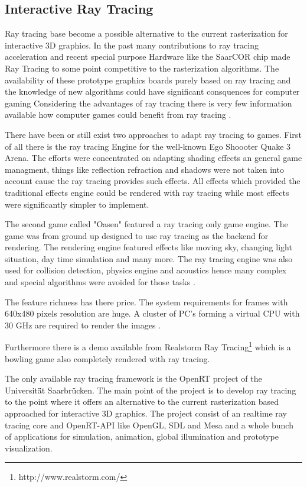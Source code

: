\documentclass[DIV10, abstracton, openright, footsepline, headsepline, twoside, 9pt,
bigheadings]{scrreprt}
\begin{document}
\subsection{Interactive Ray Tracing}
Ray tracing base become a possible alternative to the current rasterization for
interactive 3D graphics. In the past many contributions to ray tracing
acceleration and recent special purpose Hardware like the SaarCOR chip made Ray
Tracing to some point competitive to the rasterization algorithms.
The availability of these prototype graphics boards purely based on ray tracing
and the knowledge of new algorithms could have significant consquences for
computer gaming Considering the advantages of ray tracing there is very few
information available how computer games could benefit from ray tracing
\cite{Schmittler04}.

There have been or still exist two approaches to adapt ray tracing
to games. First of all there is the ray tracing Engine for the well-known Ego
Shoooter Quake 3 Arena. The efforts were concentrated on adapting shading
effects an general game managment, things like reflection refraction and
shadows were not taken into account cause the ray tracing provides such
effects. All effects which provided the traditional effects engine could be
rendered with ray tracing while most effects were significantly simpler to
implement.


The second game called "Oasen" featured a ray tracing only game engine. The
game was from ground up designed to use ray tracing as the backend for
rendering. The rendering engine featured effects like moving sky, changing
light situation, day time simulation and many more. The ray tracing engine was
also used for collision detection, physics engine and
acoustics hence many complex and special algorithms were avoided
for those tasks \cite{Schmittler04}.

The feature richness has there price. The system requirements for frames
with 640x480 pixels resolution are huge. A cluster of PC's forming a virtual
CPU with 30 GHz are required to render the images \cite{Schmittler04}.

Furthermore there is a demo available from Realstorm Ray
Tracing\footnote{http://www.realstorm.com/} which is a bowling game also
completely rendered with ray tracing.

The only available ray tracing framework is the OpenRT project of the
Universit\"ät Saarbr\"ucken. The main point of the project is to develop ray
tracing to the point where it offers an alternative to the current
rasterization based approached for interactive 3D graphics. The project consist
of an realtime ray tracing core and OpenRT-API like OpenGL, SDL and Mesa and a
whole bunch of applications for simulation, animation, global illumination and
prototype visualization.
\end{document}
